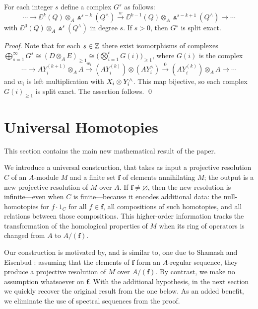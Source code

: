 \begin{lemma}
\label{split}
For each integer $s$ define a complex $G^s$ as follows:
\[
\cdots\to \DD^{k}(Q)\otimes_A \Wedge^{s-k}(Q^\wedge)\xrightarrow{w}
\DD^{k-1}(Q)\otimes_A \Wedge^{s-k+1}(Q^\wedge) \to \cdots 
\]
with $\DD^{0}(Q)\otimes_A \Wedge^{s}(Q^\wedge)$ in degree $s$.  If
$s>0$, then $G^s$ is split exact.
\end{lemma}

\begin{proof}
Note that for each $s\in{\mathbb Z}$ there exist isomorphisms of complexes
$\bigoplus_{s=1}^\infty G^s\cong (D \otimes_A E)_{\ge1} \cong
\big(\bigotimes_{i=1}^c G(i)\big)_{\ge1}$, where $G(i)$ is the complex
\[
\cdots\to
AY^{(k+1)}_i\otimes_A A
\xrightarrow{w_i}(AY^{(k)}_i)\otimes(AY^\wedge_i)
\xrightarrow{0}(AY^{(k)}_i)\otimes_A A
\to\cdots
\]
and $w_i$ is left multiplication with $X_i\otimes Y_i^\wedge$.  This map
bijective, so each complex $G(i)_{\ge1}$ is split exact.  The assertion
follows.  \qed
 \end{proof}

\section{Universal Homotopies}
\label{Universal homotopies}

This section contains the main new mathematical result of the paper.  

We introduce a universal construction, that takes as input a projective
resolution $C$ of an $A$-module $M$ and a finite set $\boldsymbol f$ of
elements annihilating $M$; the output is a new projective resolution of
$M$ over $A$.  If $\boldsymbol f\ne\varnothing$, then the new
resolution is infinite---even when $C$ is finite---because it encodes
additional data: the null-homotopies for $f\cdot1_C$ for all
$f\in\boldsymbol f$, all compositions of such homotopies, and all
relations between those compositions.  This higher-order information
tracks the transformation of the homological properties of $M$ when its
ring of operators is changed from $A$ to $A/({\boldsymbol f})$.

Our construction is motivated by, and is similar to, one due to Shamash
\cite{CI:Sh} and Eisenbud \cite{CI:Ei}: assuming that the elements of
$\boldsymbol f$ form an $A$-regular sequence, they produce a projective
resolution of $M$ over $A/({\boldsymbol f})$.  By contrast, we make no
assumption whatsoever on $\boldsymbol f$.  With the additional
hypothesis, in the next section we quickly recover the original result
from the one below.  As an added benefit, we eliminate the use of
spectral sequences from the proof.


